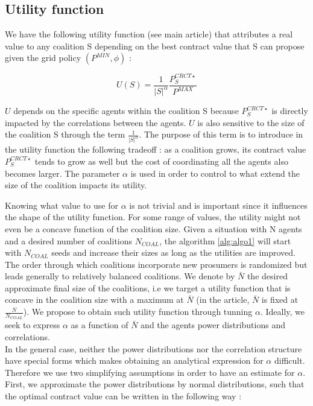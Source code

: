 \documentclass[journal]{IEEEtran}
\begin{document}
\subsection{Utility function}
\label{appendix_utility}

We have the following utility function (see main article) that attributes a real value to any coalition S depending on the best contract value that S can propose given the grid policy $ (P^{MIN},\phi)$ : 

\begin{equation}
	U(S) = \frac{1}{|S|^{\alpha}} \frac{ P_S^{CRCT \star} }{P^{MAX}}
\end{equation}

$ U $ depends on the specific agents within the coalition S because $ P_S^{CRCT \star} $ is directly impacted by the correlations between the agents. $ U $ is also sensitive to the size of the coalition S through the term $ \frac{1}{|S|^{ \alpha } } $. The purpose of this term is to introduce in the utility function the following tradeoff : as a coalition grows, its contract value $ P_S^{CRCT \star} $ tends to grow as well but the cost of coordinating all the agents also becomes larger. The parameter $ \alpha $ is used in order to control to what extend the size of the coalition impacts its utility.

Knowing what value to use for $ \alpha $ is not trivial and is important since it influences the shape of the utility function. For some range of values, the utility might not even be a concave function of the coalition size. Given a situation with N agents and a desired number of coalitions $ N_{COAL}$, the algorithm \ref{alg:algo1} will start with $ N_{COAL} $ seeds and increase their sizes as long as the utilities are improved. The order through which coalitions incorporate new prosumers is randomized but leads generally to relatively balanced coalitions. We denote by $ \bar{N} $ the desired approximate final size of the coalitions, i.e we target a utility function that is concave in the coalition size with a maximum at $ \bar{N} $ (in the article, $ \bar{N} $ is fixed at $\frac{N}{N_{COAL}}$). We propose to obtain such utility function through tunning $\alpha $. Ideally, we seek to express $ \alpha $ as a function of $ \bar{N} $ and the agents power distributions and correlations.
\\
In the general case, neither the power distributions nor the correlation structure have special forms which makes obtaining an analytical expression for $ \alpha $ difficult. Therefore we use two simplifying assumptions in order to have an estimate for $ \alpha $. First, we approximate the power distributions by normal distributions, such that the optimal contract value can be written in the following way :
\end{document}
